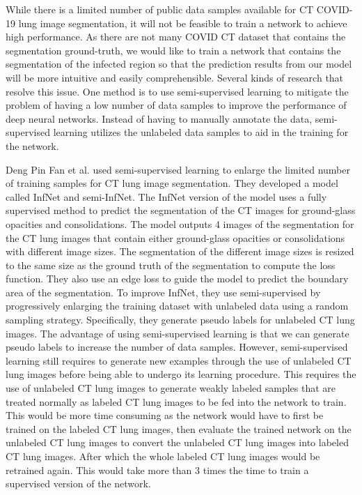 While there is a limited number of public data samples available for CT COVID-19 lung image segmentation, it will not be feasible to train a network to achieve high performance. As there are not many COVID CT dataset that contains the segmentation ground-truth, we would like to train a network that contains the segmentation of the infected region so that the prediction results from our model will be more intuitive and easily comprehensible. Several kinds of research that resolve this issue. One method is to use semi-supervised learning to mitigate the problem of having a low number of data samples to improve the performance of deep neural networks. Instead of having to manually annotate the data, semi-supervised learning utilizes the unlabeled data samples to aid in the training for the network.

Deng Pin Fan et al. \cite{ref14} used semi-supervised learning to enlarge the limited number of training samples for CT lung image segmentation. They developed a model called InfNet and semi-InfNet. The InfNet version of the model uses a fully supervised method to predict the segmentation of the CT images for ground-glass opacities and consolidations. The model outputs 4 images of the segmentation for the CT lung images that contain either ground-glass opacities or consolidations with different image sizes. The segmentation of the different image sizes is resized to the same size as the ground truth of the segmentation to compute the loss function. They also use an edge loss to guide the model to predict the boundary area of the segmentation. To improve InfNet, they use semi-supervised by progressively enlarging the training dataset with unlabeled data using a random sampling strategy. Specifically, they generate pseudo labels for unlabeled CT lung images. The advantage of using semi-supervised learning is that we can generate pseudo labels to increase the number of data samples. However, semi-supervised learning still requires to generate new examples through the use of unlabeled CT lung images before being able to undergo its learning procedure. This requires the use of unlabeled CT lung images to generate weakly labeled samples that are treated normally as labeled CT lung images to be fed into the network to train. This would be more time consuming as the network would have to first be trained on the labeled CT lung images, then evaluate the trained network on the unlabeled CT lung images to convert the unlabeled CT lung images into labeled CT lung images. After which the whole labeled CT lung images would be retrained again. This would take more than 3 times the time to train a supervised version of the network.

